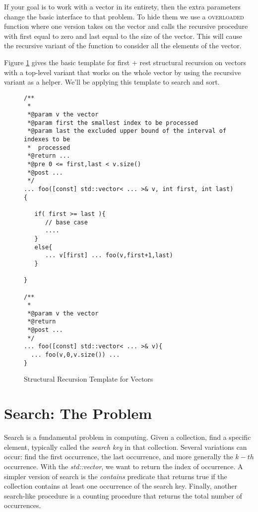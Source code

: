 \documentclass[]{tufte-handout}
\begin{document}
If your goal is to work with a vector in its entirety, then the extra parameters change the basic interface to that problem. To hide them we use a \textsc{overloaded} function where one version takes on the vector and calls the recursive procedure with first equal to zero and last equal to the size of the vector. This will cause the recursive variant of the function to consider all the elements of the vector. 

Figure \ref{code:vecrec} gives the basic template for first + rest structural recursion on vectors with a top-level variant that works on the whole vector by using the recursive variant as a helper. We'll be applying this template to search and sort.
\begin{figure}[htpb!]
\begin{lstlisting}
/**
 * 
 *@param v the vector 
 *@param first the smallest index to be processed
 *@param last the excluded upper bound of the interval of indexes to be 
 *  processed
 *@return ...
 *@pre 0 <= first,last < v.size()
 *@post ...
 */ 
... foo([const] std::vector< ... >& v, int first, int last){
 
   if( first >= last ){
      // base case
      ....
   }
   else{
      ... v[first] ... foo(v,first+1,last)
   }
	
}

/**
 * 
 *@param v the vector 
 *@return 
 *@post ...
 */ 
... foo([const] std::vector< ... >& v){
  ... foo(v,0,v.size()) ...	
}

\end{lstlisting}
\caption{Structural Recursion Template for Vectors}
\label{code:vecrec}
\end{figure}


\section{Search: The Problem}

Search is a fundamental problem in computing. Given a collection, find a specific element, typically called the \textit{search key} in that collection. Several variations can occur: find the first occurrence, the last occurrence, and more generally the $k-th$ occurrence.    With the \textit{std::vector}, we want to return the index of occurrence. A simpler version of search is the \textit{contains} predicate that returns true if the collection contains at least one occurrence of the search key. Finally, another search-like procedure is a counting procedure that returns the total number of occurrences. 
\end{document}

